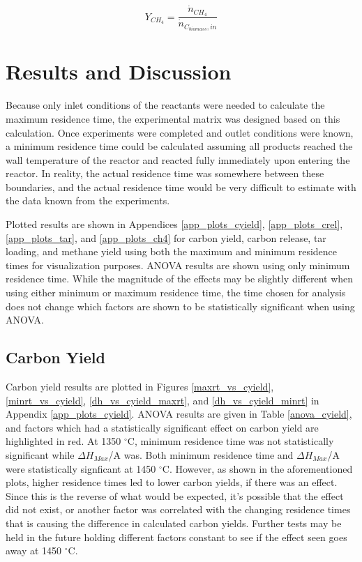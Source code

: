\documentclass[11pt,twocolumn]{article}
\begin{document}
\begin{equation}
	Y_{CH_4} = \frac{\dot{n}_{CH_4}}{\dot{n}_{C_{biomass},in}}
	\label{eq_ch4}
\end{equation}

\section*{Results and Discussion}

Because only inlet conditions of the reactants were needed to calculate the maximum residence time, the experimental matrix was designed based on this calculation.  Once experiments were completed and outlet conditions were known, a minimum residence time could be calculated assuming all products reached the wall temperature of the reactor and reacted fully immediately upon entering the reactor.  In reality, the actual residence time  was somewhere between these boundaries, and the actual residence time would be very difficult to estimate with the data known from the experiments.  

Plotted results are shown in Appendices \ref{app_plots_cyield}, \ref{app_plots_crel}, \ref{app_plots_tar}, and \ref{app_plots_ch4} for carbon yield, carbon release, tar loading, and methane yield using both the maximum and minimum residence times for visualization purposes.  ANOVA results are shown using only minimum residence time.  While the magnitude of the effects may be slightly different when using either minimum or maximum residence time, the time chosen for analysis does not change which factors are shown to be statistically significant when using ANOVA.

\subsection*{Carbon Yield}

Carbon yield results are plotted in Figures \ref{maxrt_vs_cyield}, \ref{minrt_vs_cyield}, \ref{dh_vs_cyield_maxrt}, and \ref{dh_vs_cyield_minrt} in Appendix \ref{app_plots_cyield}.  ANOVA results are given in Table \ref{anova_cyield}, and factors which had a statistically significant effect on carbon yield are highlighted in red.  At 1350 $^\circ$C, minimum residence time was not statistically significant while $\Delta H_{Max}$/A was.  Both minimum residence time and $\Delta H_{Max}$/A were statistically signficant at 1450 $^\circ$C.  However, as shown in the aforementioned plots, higher residence times led to lower carbon yields, if there was an effect.  Since this is the reverse of what would be expected, it's possible that the effect did not exist, or another factor was correlated with the changing residence times that is causing the difference in calculated carbon yields.  Further tests may be held in the future holding different factors constant to see if the effect seen goes away at 1450 $^\circ$C.
\end{document}
